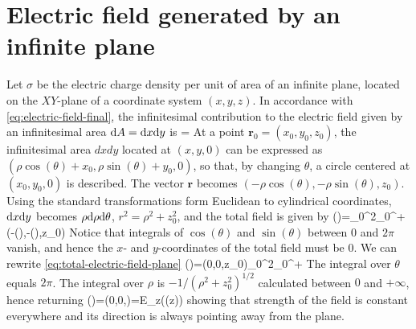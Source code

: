 \section{Electric field generated by an infinite plane}
Let $\sigma$ be the electric charge density per unit of area of an infinite plane, located on the $XY$-plane of a coordinate system $(x,y,z)$. In accordance with \ref{eq:electric-field-final}, the infinitesimal contribution to the electric field given by an infinitesimal area $\mathrm{d}A=\mathrm{d}x\mathrm{d}y$ is
\be
{}=
\ee
At a point $\mathbf{r}_{0}=(x_{0},y_{0},z_{0})$, the infinitesimal area $dxdy$ located at $(x,y,0)$ can be expressed as $(\rho\cos(\theta)+x_{0},\rho\sin(\theta)+y_{0},0)$, so that, by changing $\theta$, a circle centered at $(x_{0},y_{0},0)$ is described. The vector $\mathbf{r}$ becomes $(-\rho\cos(\theta),-\rho\sin(\theta),z_{0})$.
Using the standard transformations form Euclidean to cylindrical coordinates, $\mathrm{d}x\mathrm{d}y$ becomes $\rho\mathrm{d}\rho\mathrm{d}\theta$, $r^{2}=\rho^{2}+z_{0}^{2}$, and the total field is given by 
\be\label{eq:total-electric-field-plane}
()=\int_{0}^{2\pi}\total{\theta}\int_{0}^{+\infty}\total{\rho}(-\rho\cos(\theta),-\rho\sin(\theta),z_{0})
\ee
Notice that integrals of $\cos(\theta)$ and $\sin(\theta)$ between $0$ and $2\pi$ vanish, and hence the $x$- and $y$-coordinates of the total field must be $0$. We can rewrite \ref{eq:total-electric-field-plane}
\be\label{eq:total-electric-field-plane-simplified}
()=(0,0,z_{0})\int_{0}^{2\pi}\total{\theta}\int_{0}^{+\infty}\total{\rho}
\ee
The integral over $\theta$ equals $2\pi$. The integral over $\rho$ is $-1/(\rho^{2}+z_{0}^{2})^{1/2}$ calculated between $0$ and $+\infty$, hence returning
\be\label{eq:total-electric-field-plane-final}
()=(0,0,)=E_{z}(\sign(z))
\ee
showing that strength of the field is constant everywhere and its direction is always pointing away from the plane.